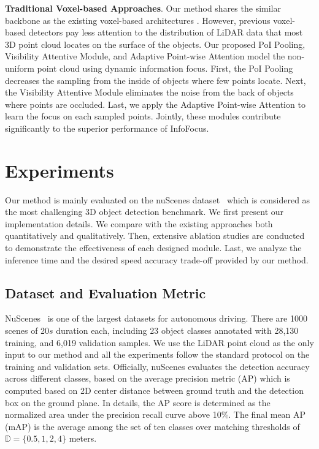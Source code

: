 \documentclass[runningheads]{llncs}
\begin{document}
\noindent\textbf{Traditional Voxel-based Approaches}. Our method shares the similar backbone as the existing voxel-based architectures \cite{lang2019PointPillars,zhou2018voxelnet,yan2018second,ye2020sarpnet}. However, previous voxel-based detectors pay less attention to the distribution of LiDAR data that most 3D point cloud locates on the surface of the objects. Our proposed PoI Pooling, Visibility Attentive Module, and Adaptive Point-wise Attention model the non-uniform point cloud using dynamic information focus. First, the PoI Pooling decreases the sampling from the inside of objects where few points locate. Next, the Visibility Attentive Module eliminates the noise from the back of objects where points are occluded. Last, we apply the Adaptive Point-wise Attention to learn the focus on each sampled points. Jointly, these modules contribute significantly to the superior performance of InfoFocus.

\section{Experiments}
Our method is mainly evaluated on the nuScenes dataset~\cite{caesar2019nuscenes} which is considered as the most challenging 3D object detection benchmark. We first present our implementation details. We compare with the existing approaches both quantitatively and qualitatively. Then, extensive ablation studies are conducted to demonstrate the effectiveness of each designed module. Last, we analyze the inference time and the desired speed accuracy trade-off provided by our method.


\subsection{Dataset and Evaluation Metric}
NuScenes~\cite{caesar2019nuscenes} is one of the largest datasets for autonomous driving. There are 1000 scenes of 20$s$ duration each, including 23 object classes annotated with 28,130 training, and 6,019 validation samples. We use the LiDAR point cloud as the only input to our method and all the experiments follow the standard protocol on the training and validation sets. Officially, nuScenes evaluates the detection accuracy across different classes, based on the average precision metric (AP) which is computed based on 2D center distance between ground truth and the detection box on the ground plane. In details, the AP score is determined as the normalized area under the precision recall curve above 10\%. The final mean AP (mAP) is the average among the set of ten classes over matching thresholds of $\mathds{D} = \{0.5, 1, 2, 4 \} $ meters.
\end{document}
